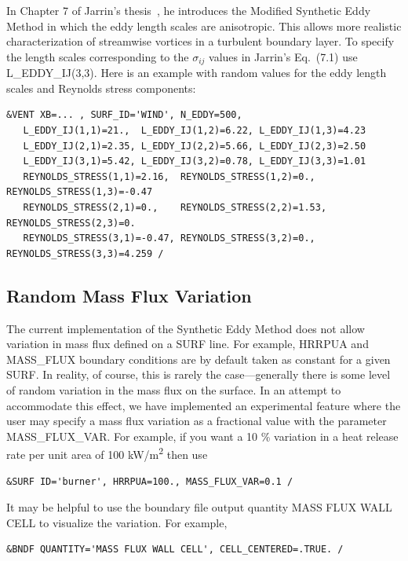 \documentclass[11pt]{book}
\begin{document}
In Chapter 7 of Jarrin's thesis~\cite{Jarrin:2008}, he introduces the Modified Synthetic Eddy Method in which the eddy length scales are anisotropic. This allows more realistic characterization of streamwise vortices in a turbulent boundary layer. To specify the length scales corresponding to the $\sigma_{ij}$ values in Jarrin's Eq.~(7.1) use {\ct L\_EDDY\_IJ(3,3)}.  Here is an example with random values for the eddy length scales and Reynolds stress components:

\begin{lstlisting}
&VENT XB=... , SURF_ID='WIND', N_EDDY=500,
   L_EDDY_IJ(1,1)=21.,  L_EDDY_IJ(1,2)=6.22, L_EDDY_IJ(1,3)=4.23
   L_EDDY_IJ(2,1)=2.35, L_EDDY_IJ(2,2)=5.66, L_EDDY_IJ(2,3)=2.50
   L_EDDY_IJ(3,1)=5.42, L_EDDY_IJ(3,2)=0.78, L_EDDY_IJ(3,3)=1.01
   REYNOLDS_STRESS(1,1)=2.16,  REYNOLDS_STRESS(1,2)=0.,   REYNOLDS_STRESS(1,3)=-0.47
   REYNOLDS_STRESS(2,1)=0.,    REYNOLDS_STRESS(2,2)=1.53, REYNOLDS_STRESS(2,3)=0.
   REYNOLDS_STRESS(3,1)=-0.47, REYNOLDS_STRESS(3,2)=0.,   REYNOLDS_STRESS(3,3)=4.259 /
\end{lstlisting}


\subsection{Random Mass Flux Variation}
\label{info:MASS_FLUX_VAR}

The current implementation of the Synthetic Eddy Method does not allow variation in mass flux defined on a {\ct SURF} line.  For example, {\ct HRRPUA} and {\ct MASS\_FLUX} boundary conditions are by default taken as constant for a given {\ct SURF}.  In reality, of course, this is rarely the case---generally there is some level of random variation in the mass flux on the surface.  In an attempt to accommodate this effect, we have implemented an experimental feature where the user may specify a mass flux variation as a fractional value with the parameter {\ct MASS\_FLUX\_VAR}.  For example, if you want a 10 \% variation in a heat release rate per unit area of 100 \si{kW/m^2} then use

\begin{lstlisting}
&SURF ID='burner', HRRPUA=100., MASS_FLUX_VAR=0.1 /
\end{lstlisting}

It may be helpful to use the boundary file output quantity {\ct MASS FLUX WALL CELL} to visualize the variation.  For example,

\begin{lstlisting}
&BNDF QUANTITY='MASS FLUX WALL CELL', CELL_CENTERED=.TRUE. /
\end{lstlisting}
\end{document}
